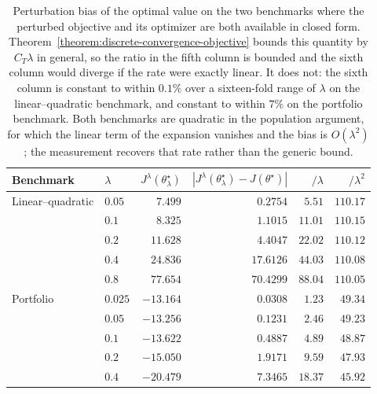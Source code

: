 \begin{table}[H]
\centering
\small
\begin{tabular}{llrrrr}
\toprule
Benchmark & $\lambda$ & $J^\lambda(\theta_\lambda^\star)$ & $|J^\lambda(\theta_\lambda^\star)-J(\theta^\star)|$ & $/\lambda$ & $/\lambda^2$ \\
\midrule
Linear--quadratic & $0.05$ & $7.499$ & $0.2754$ & $5.51$ & $110.17$ \\
 & $0.1$ & $8.325$ & $1.1015$ & $11.01$ & $110.15$ \\
 & $0.2$ & $11.628$ & $4.4047$ & $22.02$ & $110.12$ \\
 & $0.4$ & $24.836$ & $17.6126$ & $44.03$ & $110.08$ \\
 & $0.8$ & $77.654$ & $70.4299$ & $88.04$ & $110.05$ \\
\midrule
Portfolio & $0.025$ & $-13.164$ & $0.0308$ & $1.23$ & $49.34$ \\
 & $0.05$ & $-13.256$ & $0.1231$ & $2.46$ & $49.23$ \\
 & $0.1$ & $-13.622$ & $0.4887$ & $4.89$ & $48.87$ \\
 & $0.2$ & $-15.050$ & $1.9171$ & $9.59$ & $47.93$ \\
 & $0.4$ & $-20.479$ & $7.3465$ & $18.37$ & $45.92$ \\
\bottomrule
\end{tabular}
\caption{Perturbation bias of the optimal value on the two benchmarks where the perturbed objective and its optimizer are both available in closed form. Theorem~\ref{theorem:discrete-convergence-objective} bounds this quantity by $C_T\lambda$ in general, so the ratio in the fifth column is bounded and the sixth column would diverge if the rate were exactly linear. It does not: the sixth column is constant to within $0.1\%$ over a sixteen-fold range of $\lambda$ on the linear--quadratic benchmark, and constant to within $7\%$ on the portfolio benchmark. Both benchmarks are quadratic in the population argument, for which the linear term of the expansion vanishes and the bias is $O(\lambda^2)$; the measurement recovers that rate rather than the generic bound.}
\label{tab:objective-bias-scaling}
\end{table}
